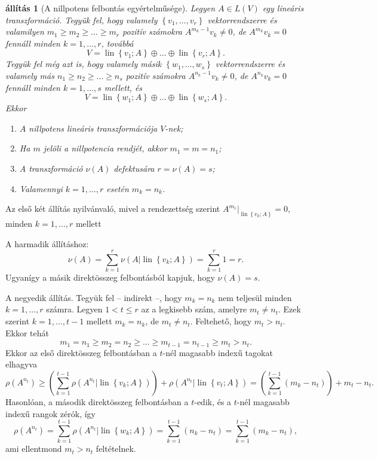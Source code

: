 \documentclass[9pt, a4paper, showtrims]{memoir}
\makeatletter
\renewenvironment{proof}[1][\proofname]
    {\par\pushQED{\qed}%
    \normalfont \topsep6\p@\@plus6\p@\relax
    \trivlist
    \item[\hskip\labelsep
        \itshape
    #1\@addpunct{:}]\ignorespaces}
    {\popQED\endtrivlist\@endpefalse}
\theoremstyle{plain}
\newtheorem{proposition}{állítás}[chapter]
\theoremstyle{remark}
\theoremstyle{definition}
\DeclareMathOperator{\lin}{lin}
\makeatother
\begin{document}
\begin{proposition}[A nillpotens felbontás egyértelműsége]
    Legyen $A\in L\left( V \right)$ egy lineáris transzformáció.
    Tegyük fel, hogy valamely $\left\{ v_1,\dots,v_r \right\}$ vektorrendszerre és valamilyen 
    $m_1\geq m_2\geq \dots\geq m_r$ pozitív számokra
    $A^{m_k-1}v_k\neq 0$, de $A^{m_k}v_k=0$ fennáll minden $k=1,\dots,r$, továbbá
    \[
        V=\lin\left\{ v_1;A \right\}\oplus \dots \oplus\lin\left\{ v_r;A \right\}.
    \]
    Tegyük fel még azt is, 
    hogy valamely másik $\left\{ w_1,\dots,w_s \right\}$ vektorrendszerre és valamely más
    $n_1\geq n_2\geq \dots\geq n_s$ pozitív számokra
    $A^{n_k-1}v_k\neq 0$, de $A^{n_k}v_k=0$ fennáll minden $k=1,\dots,s$ mellett, és
    \[
        V=\lin\left\{ w_1;A \right\}\oplus \dots \oplus\lin\left\{ w_s;A \right\}.
    \]
    Ekkor
    \begin{enumerate}
        \item $A$ nillpotens lineáris transzformációja $V$-nek;
        \item Ha $m$ jelöli a nillpotencia rendjét, akkor
            \(
            m_1=m=n_1
            \);
        \item A transzformáció $\nu\left( A \right)$ defektusára
            \(
            r=\nu\left( A \right)=s
            \);
        \item Valamennyi $k=1,\dots,r$ esetén
            \(
            m_k=n_k
            \).\qedhere
    \end{enumerate}
\end{proposition}
\begin{proof}
    Az első két állítás nyilvánvaló, mivel a rendezettség szerint 
    $A^{m_1}|_{\lin\left\{ v_k;A \right\}}=0$,
    minden $k=1,\dots,r$ mellett

    A harmadik állításhoz:
    \[
        \nu\left( A \right)=\sum_{k=1}^r\nu\left( A|\lin\left\{ v_k;A \right\} \right)=
        \sum_{k=1}^r1=r.
    \]
    Ugyanígy a másik direktösszeg felbontásból kapjuk, hogy $\nu\left( A \right)=s$.

    A negyedik állítás.
    Tegyük fel -- indirekt --, hogy $m_k=n_k$ nem teljesül minden $k=1,\dots,r$ számra.
    Legyen $1<t\leq r$ az a legkisebb szám, amelyre $m_t\neq n_t$.
    Ezek szerint $k=1,\dots,t-1$ mellett $m_k=n_k$, de $m_t\neq n_t$.
    Feltehető, hogy $m_t>n_t$. 
    Ekkor tehát
    \[
        m_1=n_1\geq m_2=n_2\geq\dots\geq m_{t-1}=n_{t-1}\geq m_t>n_t.
    \]
    Ekkor az első direktösszeg felbontásban a $t$-nél magasabb indexű tagokat elhagyva
    \[
        \rho\left( A^{n_t} \right)
        \geq
        \left( \sum_{k=1}^{t-1}\rho\left( A^{n_t}|\lin\left\{ v_k;A \right\} \right) \right)
        +\rho\left( A^{n_t}|\lin\left\{ v_t;A \right\} \right)
        =
        \left( \sum_{k=1}^{t-1}(m_k-n_t) \right)+m_t-n_t.
    \]
    Hasonlóan, a második direktösszeg felbontásban a $t$-edik, és a $t$-nél magasabb indexű rangok zérók, így
    \[
        \rho\left( A^{n_t} \right)
        =
        \sum_{k=1}^{t-1}\rho\left( A^{n_t}|\lin\left\{ w_k;A \right\} \right)
        =
        \sum_{k=1}^{t-1}(n_k-n_t)
        =
        \sum_{k=1}^{t-1}(m_k-n_t),
    \]
    ami ellentmond $m_t>n_t$ feltételnek.
\end{proof}
\end{document}
